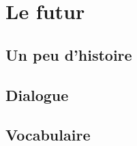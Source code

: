 \chapter{Le futur}\label{Futur}

\section{Un peu d'histoire}
\section*{Dialogue}
\section*{Vocabulaire}